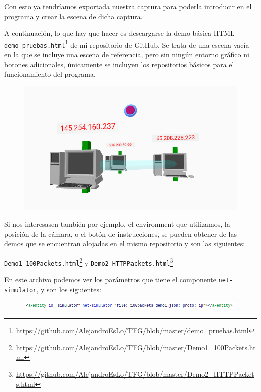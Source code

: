 \documentclass[a4paper, 12pt]{book}
\begin{document}
Con esto ya tendríamos exportada nuestra captura para poderla introducir en el programa y crear la escena de dicha captura.

A continuación, lo que hay que hacer es descargarse la demo básica HTML \texttt{demo\_pruebas.html}\footnote{\url{https://github.com/AlejandroEsLo/TFG/blob/master/demo_pruebas.html}} de mi repositorio de GitHub. Se trata de una escena vacía en la que se incluye una escena de referencia, pero sin ningún entorno gráfico ni botones adicionales, únicamente se incluyen los repositorios básicos para el funcionamiento del programa.

\begin{figure}[h]
\centering
    \includegraphics[scale=0.55]{img/escena_vacia.png}
\end{figure}

Si nos interesasen también por ejemplo, el environment que utilizamos, la posición de la cámara, o el botón de instrucciones, se pueden obtener de las demos que se encuentran alojadas en el mismo repositorio y son las siguientes:

\texttt{Demo1\_100Packets.html}\footnote{\url{https://github.com/AlejandroEsLo/TFG/blob/master/Demo1_100Packets.html}} y \texttt{Demo2\_HTTPPackets.html}\footnote{\url{https://github.com/AlejandroEsLo/TFG/blob/master/Demo2_HTTPPackets.html}}

En este archivo podemos ver los parámetros que tiene el componente \texttt{net-simulator}, y son los siguientes:

\begin{figure}[h]
\centering
    \includegraphics[scale=0.7]{img/parametros.png}
\end{figure}
\end{document}
